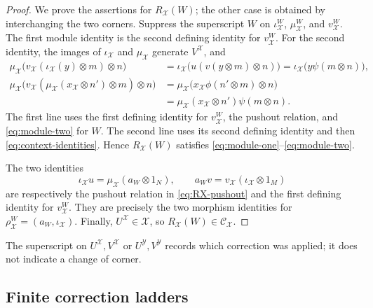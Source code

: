 \documentclass[11pt,reqno]{amsart}
\theoremstyle{definition}
\theoremstyle{remark}
\numberwithin{equation}{section}
\begin{document}
\begin{proof}
We prove the assertions for $R_{\mathcal X}(W)$; the other case is obtained
by interchanging the two corners.  Suppress the superscript $W$ on
$\iota_{\mathcal X}^W$, $\mu_{\mathcal X}^W$, and
$v_{\mathcal X}^W$.  The first module identity is the second defining
identity for $v_{\mathcal X}^W$.  For the second identity, the images of
$\iota_{\mathcal X}$ and $\mu_{\mathcal X}$ generate
$V^{\mathcal X}$, and
\begin{align*}
 \mu_{\mathcal X}\bigl(
   v_{\mathcal X}(\iota_{\mathcal X}(y)\otimes m)\otimes n\bigr)
 &=\iota_{\mathcal X}\bigl(u(v(y\otimes m)\otimes n)\bigr)
  =\iota_{\mathcal X}\bigl(y\psi(m\otimes n)\bigr),\\
 \mu_{\mathcal X}\bigl(
   v_{\mathcal X}(\mu_{\mathcal X}(x_{\mathcal X}\otimes n')\otimes m)
   \otimes n\bigr)
 &=\mu_{\mathcal X}\bigl(
   x_{\mathcal X}\phi(n'\otimes m)\otimes n\bigr)\\
 &=\mu_{\mathcal X}(x_{\mathcal X}\otimes n')\psi(m\otimes n).
\end{align*}
The first line uses the first defining identity for $v_{\mathcal X}^W$,
the pushout relation, and \eqref{eq:module-two} for $W$.  The second line
uses its second defining identity and then
\eqref{eq:context-identities}.  Hence
$R_{\mathcal X}(W)$ satisfies
\eqref{eq:module-one}--\eqref{eq:module-two}.

The two identities
\[
 \iota_{\mathcal X}u
 =\mu_{\mathcal X}(a_W\otimes1_N),
 \qquad
 a_Wv=v_{\mathcal X}(\iota_{\mathcal X}\otimes1_M)
\]
are respectively the pushout relation in \eqref{eq:RX-pushout} and the
first defining identity for $v_{\mathcal X}^W$.  They are precisely the two
morphism identities for
$\rho_{\mathcal X}^W=(a_W,\iota_{\mathcal X})$.  Finally,
$U^{\mathcal X}\in\mathcal X$, so
$R_{\mathcal X}(W)\in\mathcal C_{\mathcal X}$.
\end{proof}

The superscript on $U^{\mathcal X},V^{\mathcal X}$ or
$U^{\mathcal Y},V^{\mathcal Y}$ records which correction was applied; it
does not indicate a change of corner.

\subsection{Finite correction ladders}
\end{document}
